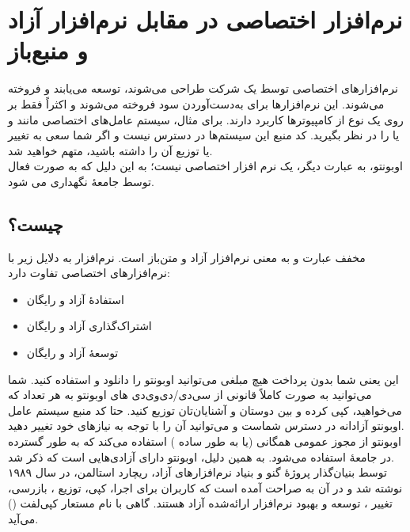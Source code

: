 \section{نرم‌افزار اختصاصی در مقابل نرم‌افزار آزاد و منبع‌باز}
نرم‌افزارهای اختصاصی توسط یک شرکت طراحی می‌شوند، توسعه می‌یابند و فروخته می‌شوند. این نرم‌افزارها برای به‌دست‌آوردن سود فروخته می‌شوند و اکثراً فقط بر روی یک نوع از کامپیوترها کاربرد دارند. برای مثال، سیستم عامل‌های اختصاصی مانند  و یا  را در نظر بگیرید. کد منبع این سیستم‌ها در دسترس نیست و اگر شما سعی به تغییر یا توزیع آن را داشته باشید، متهم خواهید شد.\\
اوبونتو، به عبارت دیگر، یک نرم افزار اختصاصی نیست؛ به این دلیل که به صورت فعال توسط جامعهٔ  نگهداری می شود.

\subsection*{ چیست؟}
 مخفف عبارت  و به معنی نرم‌افزار آزاد و متن‌باز است. نرم‌افزار  به دلایل زیر با نرم‌افزارهای اختصاصی تفاوت دارد:

\begin{itemize}
\item استفادهٔ آزاد و رایگان
\item اشتراک‌گذاری آزاد و رایگان
\item توسعهٔ آزاد و رایگان
\end{itemize}

این یعنی شما بدون پرداخت هیچ مبلغی می‌توانید اوبونتو را دانلود و استفاده کنید. شما می‌توانید به صورت کاملاً قانونی از سی‌دی/دی‌وی‌دی های اوبونتو به هر تعداد که می‌خواهید، کپی کرده و بین دوستان و آشنایان‌تان توزیع کنید. حتا کد منبع سیستم عامل اوبونتو آزادانه در دسترس شماست و می‌توانید آن را با توجه به نیازهای خود تغییر دهید.\\
اوبونتو از مجوز عمومی همگانی   (یا به طور ساده ) استفاده می‌کند که به طور گسترده در جامعهٔ  استفاده می‌شود. به همین دلیل، اوبونتو دارای آزادی‌هایی است که ذکر شد.\\
 توسط بنیان‌گذار پروژهٔ گنو و بنیاد نرم‌افزارهای آزاد، ریچارد استالمن، در سال ۱۹۸۹ نوشته شد و در آن به صراحت آمده است که کاربران برای اجرا، کپی، توزیع ، بازرسی، تغییر ، توسعه و بهبود نرم‌افزار ارائه‌شده آزاد هستند. گاهی  با  نام مستعار کپی‌لفت () می‌آید.

